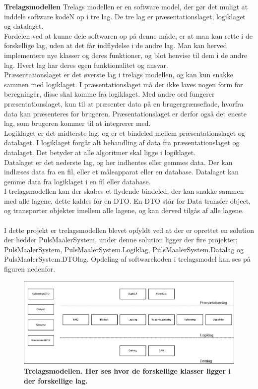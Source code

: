 \textbf{Trelagsmodellen} 
Trelags modellen er en software model, der gør det muligt at inddele software kodeN op i tre lag. De tre lag er præsentationslaget, logiklaget og datalaget. \\
Fordelen ved at kunne dele softwaren op på denne måde, er at man kan rette i de forskellige lag, uden at det får indflydelse i de andre lag. Man kan herved implementere nye klasser og deres funktioner, og blot henvise til dem i de andre lag. Hvert lag har deres egen funktionalitet og ansvar.\\
Præsentationslaget er det øverste lag i trelags modellen, og kan kun snakke sammen med logiklaget. I præsentationslaget må der ikke laves nogen form for beregninger, disse skal komme fra logiklaget. Med andre ord fungerer præsentationslaget, kun til at præsenter data på en brugergrænseflade, hvorfra data kan præsenteres for brugeren. Præsentationslaget er derfor også det eneste lag, som brugeren kommer til at integrerer med.\\
Logiklaget er det midterste lag, og er et bindeled mellem præsentationslaget og datalaget. I logiklaget forgår alt behandling af data fra præsentationslaget og datalaget. Det betyder at alle algoritmer skal ligge i logiklaget. \\
Datalaget er det nederste lag, og her indhentes eller gemmes data. Der kan indlæses data fra en fil, eller et måleapparat eller en database. Datalaget kan gemme data fra logiklaget i en fil eller database. \\
I trelagsmodellen kan der skabes et flydende bindeled, der kan snakke sammen med alle lagene, dette kaldes for en DTO. En DTO står for Data transfer object, og transporter objekter imellem alle lagene, og kan derved tilgås af alle lagene. \\
\\
I dette projekt er trelagsmodellen blevet opfyldt ved at der er oprettet en solution der hedder PulsMaalerSystem, under denne solution ligger der fire projekter; PulsMaalerSystem, PulsMaalerSystem.Logiklag, PulsMaalerSystem.Datalag og PulsMaalerSystem.DTOlag. Opdeling af softwarekoden i trelagsmodel kan ses på figuren nedenfor. 
\begin{figure}[H]
\includegraphics[width =1.0\textwidth , center]{billeder/Trelagsmodel}
\caption{\textbf{Trelagsmodellen. Her ses hvor de forskellige klasser ligger i der forskellige lag.}}
\end{figure}
